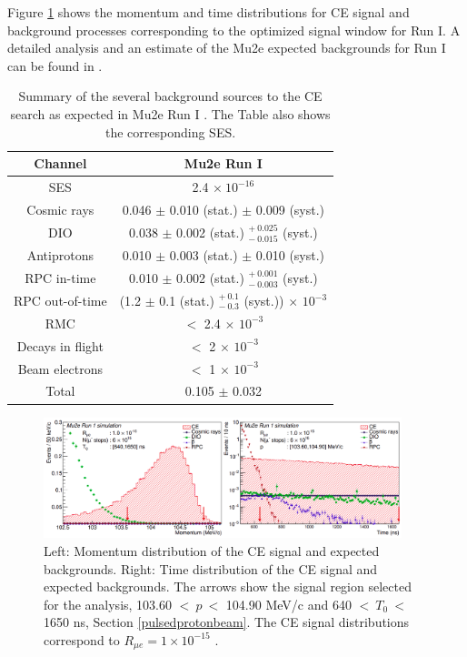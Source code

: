 Figure \ref{fig:sensitivity} shows the momentum and time distributions 
for CE signal and background processes corresponding to the optimized 
signal window for Run I. A detailed analysis and an estimate of the Mu2e 
expected backgrounds for Run I can be found in \cite{universe9010054}.
\begin{center}  
\begin{table}[!h]
\centering
\renewcommand{\arraystretch}{1.2}
\begin{tabular}{| c | c |}
\hline
\textbf{Channel} & \textbf{Mu2e Run I}\\
\hline
SES & 2.4 $\times \ 10^{-16}$ \\
\hline
Cosmic rays & 0.046 $\pm$ 0.010 (stat.) $\pm$ 0.009 (syst.) \\
DIO & 0.038 $\pm$ 0.002 (stat.) $ ^{+ \ 0.025} _{- \ 0.015}$ (syst.)\\
Antiprotons & 0.010 $\pm$ 0.003 (stat.) $\pm$ 0.010 (syst.) \\
RPC in-time & 0.010 $\pm$ 0.002 (stat.) $ ^{+ \ 0.001} _{- \ 0.003}$ (syst.)\\
RPC out-of-time & (1.2 $\pm$ 0.1  (stat.) $ ^{+ \ 0.1} _{- \ 0.3}$ (syst.)) $\times$ $10^{-3}$ \\
RMC & $<$ 2.4 $\times$ $10^{-3}$ \\
Decays in flight & $<$ 2 $\times$ $10^{-3}$ \\
Beam electrons & $<$ 1 $\times$ $10^{-3}$ \\
\hline
Total &  0.105 $\pm$ 0.032\\
\hline
\end{tabular}
\caption{Summary of the several background sources to 
the CE search as expected in Mu2e Run I \cite{universe9010054}. 
The Table also shows the corresponding SES. }

\label{tab:summarybkg}
\end{table}
\end{center}
\begin{figure}[!h]
\centering
\includegraphics[width =0.93\textwidth]{figures/png/Screenshot_20240225_102708.png}
\caption[Mu2e simulated signal.]{Left: Momentum distribution of the CE signal and expected backgrounds. Right: Time distribution of the CE signal and expected backgrounds. The arrows show the signal region selected for the analysis, 103.60 $< \ p \ < $ 104.90 MeV/c and 640 $< \ T_0 \ < $ 1650 ns, Section \ref{pulsedprotonbeam}. The CE signal distributions correspond to $R_{\mu e} = 1 \times 10^{-15}$ \cite{universe9010054}.}
\label{fig:sensitivity}
\end{figure}
